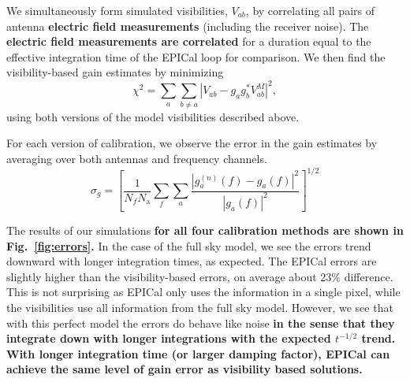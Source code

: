 \documentclass[a4paper,fleqn,usenatbib]{../mnras}
\newcommand{\Nant}{\ensuremath{N_{\mathrm{a}}}}
\begin{document}
We simultaneously form simulated visibilities, $V_{ab}$, by correlating all pairs of antenna \textbf{electric field 
measurements} (including the receiver noise). The \textbf{electric field measurements are correlated} for a duration equal to 
the effective integration time of the EPICal loop for comparison. We then find the 
visibility-based gain estimates by minimizing
\begin{equation}\label{eq:vis_cal}
\chi^2 = \sum_a\sum_{b\ne a} \left|V_{ab}-g_a g_b^* V^M_{ab}\right|^2,
\end{equation}
using both versions of the model visibilities described above.

 For each version of calibration, we observe the error in the gain estimates by averaging over both 
 antennas and frequency channels.
\begin{equation}\label{eq:gain_error}
\sigma_g = \left[\frac{1}{N_f \Nant} \sum_f \sum_a \frac{\left|g^{(n)}_a(f)-g_a(f)\right|^2}{\left|g_a(f)\right|^2}\right]^{1/2}
\end{equation}

The results of our simulations \textbf{for all four calibration methods are shown in Fig.~\ref{fig:errors}. }
In the case of the full sky model, we see the errors trend 
downward with longer integration times, as expected. The EPICal errors are slightly higher than 
the visibility-based errors, on average about 23\% difference. This is not surprising as EPICal 
only uses the information in a single pixel, while the visibilities use all information from the full 
sky model. However, we see that with this perfect model the errors do behave like noise
\textbf{in the sense that they integrate down with longer integrations with the expected $t^{-1/2}$ 
trend. }
\textbf{With longer integration time (or larger damping factor), EPICal can achieve the same 
level of gain error as visibility based solutions.}
\end{document}
